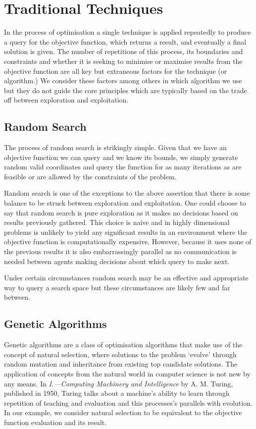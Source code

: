 \section{Traditional Techniques}
	\label{sec:traditional}
	In the process of optimisation a single technique is applied repeatedly to produce a query for the objective function, which returns a result, and eventually a final solution is given. The number of repetitions of this process, its boundaries and constraints and whether it is seeking to minimise or maximise results from the objective function are all key but extraneous factors for the technique (or algorithm.) We consider these factors among others in which algorithm we use but they do not guide the core principles which are typically based on the trade off between exploration and exploitation.
	
	\subsection{Random Search}
		\label{sec:traditional_random} 
		The process of random search is strikingly simple. Given that we have an objective function we can query and we know its bounds, we simply generate random valid coordinates and query the function for as many iterations as are feasible or are allowed by the constraints of the problem.

		Random search is one of the exceptions to the above assertion that there is some balance to be struck between exploration and exploitation. One could choose to say that random search is pure exploration as it makes no decisions based on results previously gathered. This choice is naive and in highly dimensional problems is unlikely to yield any significant results in an environment where the objective function is computationally expensive. However, because it uses none of the previous results it is also embarrassingly parallel as no communication is needed between agents making decisions about which query to make next.
		
		Under certain circumstances random search may be an effective and appropriate way to query a search space but these circumstances are likely few and far between.
		
	\subsection{Genetic Algorithms}  
		\label{sec:traditional_genetic}
		Genetic algorithms are a class of optimisation algorithms that make use of the concept of natural selection\cite{darwin1909origin}, where solutions to the problem `evolve' through random mutation and inheritance from existing top candidate solutions. The application of concepts from the natural world in computer science is not new by any means. In \textit{I.---Computing Machinery and Intelligence} by A. M. Turing\cite{turing1950learning}, published in 1950, Turing talks about a machine's ability to learn through repetition of teaching and evaluation and this processes's parallels with evolution. In our example, we consider natural selection to be equivalent to the objective function evaluation and its result. 


